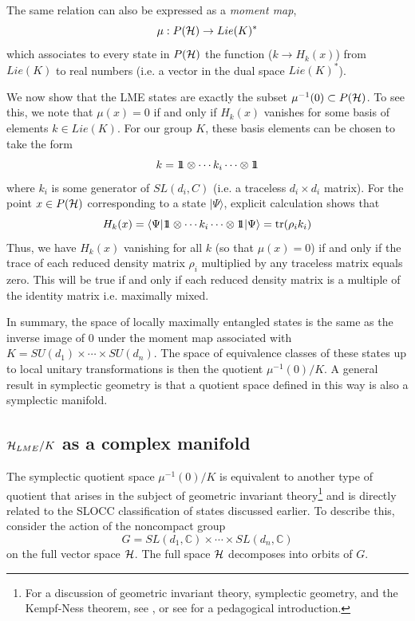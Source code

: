 \documentclass[12pt]{article}
\theoremstyle{definition}
\newcommand{\be}{\begin{equation}}
\newcommand{\ee}{\end{equation}}
\def\identity{{\rlap{1} \hskip 1.6pt \hbox{1}}}
\newcommand{\tr}{{\rm tr}}
\begin{document}
The same relation can also be expressed as a {\it moment map},
\be
\mu : P({\cal H}) \to Lie(K)^*
\ee
which associates to every state in $P({\cal H})$ the function ($k \to H_k(x)$) from $Lie(K)$ to real numbers (i.e. a vector in the dual space $Lie(K)^*$).

We now show that the LME states are exactly the subset $\mu^{-1}(0) \subset P({\cal H})$. To see this, we note that $\mu(x) = 0$ if and only if $H_k(x)$ vanishes for some basis of elements $k \in Lie(K)$. For our group $K$, these basis elements can be chosen to take the form
\be
k = \identity \otimes \cdots k_i \cdots \otimes \identity
\ee
where $k_i$ is some generator of $SL(d_i,C)$ (i.e. a traceless $d_i \times d_i$ matrix). For the point $x \in P({\cal H})$ corresponding to a state $|\Psi \rangle$, explicit calculation shows that
\be
H_k(x) = \langle \Psi| \identity \otimes \cdots k_i \cdots \otimes \identity | \Psi \rangle = \tr (\rho_i k_i)
\ee
Thus, we have $H_k(x)$ vanishing for all $k$ (so that $\mu(x)=0$) if and only if the trace of each reduced density matrix $\rho_i$ multiplied by any traceless matrix equals zero. This will be true if and only if each reduced density matrix is a multiple of the identity matrix i.e. maximally mixed.

In summary, the space of locally maximally entangled states is the same as the inverse image of $0$ under the moment map associated with $K = SU(d_1) \times \cdots \times SU(d_n)$. The space of equivalence classes of these states up to local unitary transformations is then the quotient $\mu^{-1}(0)/K$. A general result in symplectic geometry is that a quotient space defined in this way is also a symplectic manifold.

\subsection{${\cal H}_{LME}/K$ as a complex manifold}

The symplectic quotient space $\mu^{-1}(0)/K$ is equivalent to another type of quotient that arises in the subject of geometric invariant theory\footnote{For a discussion of geometric
invariant theory, symplectic geometry, and the Kempf-Ness theorem, see
\cite{mfk}, or see \cite{Hoskins} for a pedagogical introduction.} and is directly related to the SLOCC classification of states discussed earlier. To describe this, consider the action of the noncompact group
\be
G = SL(d_1,\mathbb{C}) \times \cdots \times SL(d_n,\mathbb{C})
\ee
on the full vector space ${\cal H}$. The full space ${\cal H}$ decomposes into orbits of $G$.
\end{document}

